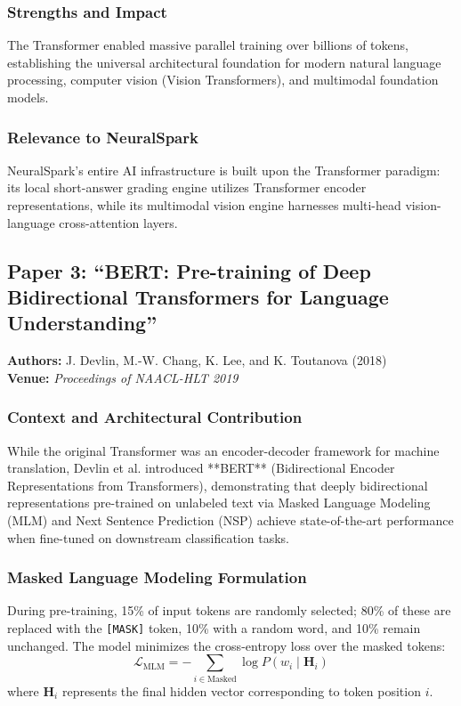 \subsubsection{Strengths and Impact}
The Transformer enabled massive parallel training over billions of tokens, establishing the universal architectural foundation for modern natural language processing, computer vision (Vision Transformers), and multimodal foundation models.

\subsubsection{Relevance to NeuralSpark}
NeuralSpark's entire AI infrastructure is built upon the Transformer paradigm: its local short-answer grading engine utilizes Transformer encoder representations, while its multimodal vision engine harnesses multi-head vision-language cross-attention layers.

\subsection{Paper 3: ``BERT: Pre-training of Deep Bidirectional Transformers for Language Understanding''}
\textbf{Authors:} J. Devlin, M.-W. Chang, K. Lee, and K. Toutanova (2018) \cite{devlin2018} \\
\textbf{Venue:} \textit{Proceedings of NAACL-HLT 2019}

\subsubsection{Context and Architectural Contribution}
While the original Transformer was an encoder-decoder framework for machine translation, Devlin et al. introduced **BERT** (Bidirectional Encoder Representations from Transformers), demonstrating that deeply bidirectional representations pre-trained on unlabeled text via Masked Language Modeling (MLM) and Next Sentence Prediction (NSP) achieve state-of-the-art performance when fine-tuned on downstream classification tasks.

\subsubsection{Masked Language Modeling Formulation}
During pre-training, 15\% of input tokens are randomly selected; 80\% of these are replaced with the \texttt{[MASK]} token, 10\% with a random word, and 10\% remain unchanged. The model minimizes the cross-entropy loss over the masked tokens:
\begin{equation}
    \mathcal{L}_{\text{MLM}} = -\sum_{i \in \text{Masked}} \log P(w_i \mid \mathbf{H}_i)
\end{equation}
where $\mathbf{H}_i$ represents the final hidden vector corresponding to token position $i$.

